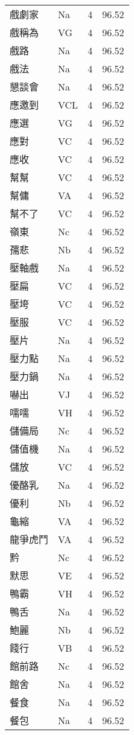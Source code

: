 \documentclass[twocolumn]{book}
\begin{document}
\begin{supertabular}{llrr}
戲劇家 & Na & 4 &  96.52\\
戲稱為 & VG & 4 &  96.52\\
戲路 & Na & 4 &  96.52\\
戲法 & Na & 4 &  96.52\\
懇談會 & Na & 4 &  96.52\\
應邀到 & VCL & 4 &  96.52\\
應選 & VG & 4 &  96.52\\
應對 & VC & 4 &  96.52\\
應收 & VC & 4 &  96.52\\
幫幫 & VC & 4 &  96.52\\
幫傭 & VA & 4 &  96.52\\
幫不了 & VC & 4 &  96.52\\
嶺東 & Nc & 4 &  96.52\\
孺悲 & Nb & 4 &  96.52\\
壓軸戲 & Na & 4 &  96.52\\
壓扁 & VC & 4 &  96.52\\
壓垮 & VC & 4 &  96.52\\
壓服 & VC & 4 &  96.52\\
壓片 & Na & 4 &  96.52\\
壓力點 & Na & 4 &  96.52\\
壓力鍋 & Na & 4 &  96.52\\
嚇出 & VJ & 4 &  96.52\\
嚅嚅 & VH & 4 &  96.52\\
儲備局 & Nc & 4 &  96.52\\
儲值機 & Na & 4 &  96.52\\
儲放 & VC & 4 &  96.52\\
優酪乳 & Na & 4 &  96.52\\
優利 & Nb & 4 &  96.52\\
龜縮 & VA & 4 &  96.52\\
龍爭虎鬥 & VA & 4 &  96.52\\
黔 & Nc & 4 &  96.52\\
默思 & VE & 4 &  96.52\\
鴨霸 & VH & 4 &  96.52\\
鴨舌 & Na & 4 &  96.52\\
鮑麗 & Nb & 4 &  96.52\\
餞行 & VB & 4 &  96.52\\
館前路 & Nc & 4 &  96.52\\
館舍 & Na & 4 &  96.52\\
餐食 & Na & 4 &  96.52\\
餐包 & Na & 4 &  96.52\\

\end{supertabular}
\end{document}
